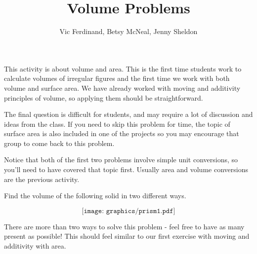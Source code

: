 \documentclass{ximera}
\title{Volume Problems}
\author{Vic Ferdinand, Betsy McNeal, Jenny Sheldon}
\begin{document}
\begin{abstract}
\end{abstract}

\maketitle

\begin{instructorIntro}
This activity is about volume and area.  This is the first time students work to calculate volumes of irregular figures and the first time we work with both volume and surface area.  We have already worked with moving and additivity principles of volume, so applying them should be straightforward.

The final question is difficult for students, and may require a lot of discussion and ideas from the class.  If you need to skip this problem for time, the topic of surface area is also included in one of the projects so you may encourage that group to come back to this problem.

Notice that both of the first two problems involve simple unit conversions, so you'll need to have covered that topic first.  Usually area and volume conversions are the previous activity.
\end{instructorIntro}

\begin{problem}
Find the volume of the following solid in two different ways.

\[
\texttt{[image: graphics/prism1.pdf]}
\]

\begin{instructorNotes}
There are more than two ways to solve this problem - feel free to have as many present as possible!  This should feel similar to our first exercise with moving and additivity with area.
\end{instructorNotes}
\end{problem}
\end{document}
